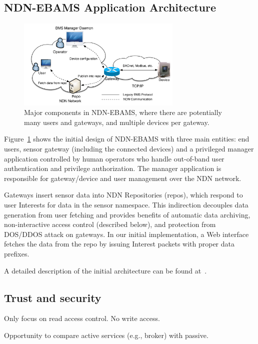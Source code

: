 \subsection{NDN-EBAMS Application Architecture} 
 
\begin{figure}[!ht]
\centering
\includegraphics[width=0.7\textwidth, keepaspectratio=true]{figures/bms-arch.pdf}
\caption{Major components in NDN-EBAMS, where there are potentially many users and gateways, and multiple devices per gateway.}
\label{design:arch}
\end{figure}
 
Figure~\ref{design:arch} shows the initial design of NDN-EBAMS with three main entities: end users, sensor gateway (including the connected devices) and a privileged manager application controlled by human operators who handle out-of-band user authentication and privilege authorization. The manager application is responsible for gateway/device and user management over the NDN network.


Gateways insert sensor data into NDN Repositories (repos), which respond to user Interests for data in the sensor namespace. This indirection decouples data generation from user fetching and provides benefits of automatic data archiving, 
non-interactive access control (described below), and protection from DOS/DDOS attack on gateways. In our initial implementation, a Web interface fetches the data from the repo by issuing Interest packets with proper data prefixes.

A detailed description of the initial architecture can be found at~\cite{secure-ndn-bms-ieee}.

  
\subsection{Trust and security}
 
Only focus on read access control. No write access.

Opportunity to compare active services (e.g., broker) with passive. 

